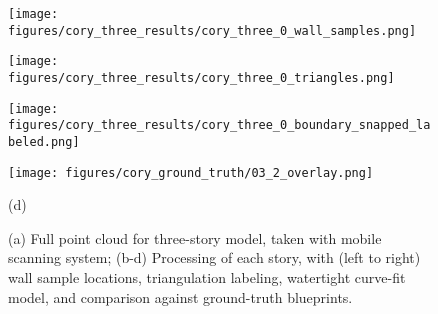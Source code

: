 \documentclass[10pt,twocolumn,letterpaper]{article}
\begin{document}
\begin{figure*}[t]
\begin{minipage}[b]{0.24\linewidth}
  \centering
  \centerline{\texttt{[image: figures/cory\_three\_results/cory\_three\_0\_wall\_samples.png]}}
\end{minipage}
\hfill
\begin{minipage}[b]{0.24\linewidth}
  \centering
  \centerline{\texttt{[image: figures/cory\_three\_results/cory\_three\_0\_triangles.png]}}
\end{minipage}
\hfill
\begin{minipage}[b]{0.24\linewidth}
  \centering
  \centerline{\texttt{[image: figures/cory\_three\_results/cory\_three\_0\_boundary\_snapped\_labeled.png]}}
\end{minipage}
\hfill
\begin{minipage}[b]{0.24\linewidth}
  \centering
  \centerline{\texttt{[image: figures/cory\_ground\_truth/03\_2\_overlay.png]}}
\end{minipage}
\centerline{(d)}
\linebreak

\caption{(a) Full point cloud for three-story model, taken with mobile scanning system; (b-d) Processing of each story, with (left to right) wall sample locations, triangulation labeling, watertight curve-fit model, and comparison against ground-truth blueprints.}
\label{fig:cory_three_results}

\end{figure*}

\end{document}
